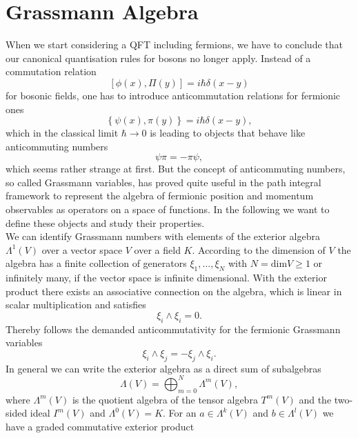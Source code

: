 \section{Grassmann Algebra}
When we start considering a QFT including fermions, we have to conclude that our canonical quantisation rules for bosons no longer apply. Instead of a commutation relation
\begin{equation}
\left[ \phi(x),\Pi(y)\right] = i \hbar \delta(x-y)
\end{equation}
for bosonic fields, one has to introduce anticommutation relations for fermionic ones \cite{Cartier:2002zp}
\begin{equation}
\left\lbrace \psi(x),\pi(y) \right\rbrace = i \hbar \delta(x-y),
\end{equation}
which in the classical limit $\hbar \rightarrow 0$ is leading to objects that behave like anticommuting numbers
\begin{equation}
\psi\pi = -\pi\psi,
\end{equation}
which seems rather strange at first. But the concept of anticommuting numbers, so called Grassmann variables, has proved quite useful in the path integral framework to represent the algebra of fermionic position and momentum observables as operators on a space of functions. In the following we want to define these objects and study their properties.\\[1cm]
%
%
We can identify Grassmann numbers with elements of the exterior algebra $\Lambda^{1}(V)$ over a vector space $V$ over a field $K$. According to the dimension of $V$ the algebra has a finite collection of generators $\xi_{1},\ldots,\xi_{N}$ with $N=\text{dim}V \geq 1$ or infinitely many, if the vector space is infinite dimensional. With the exterior product there exists an associative connection on the algebra, which is linear in scalar multiplication and satisfies
\begin{equation}
\xi_{i}\wedge \xi_{i} =0.
\label{wedge_zero}
\end{equation}
Thereby follows the demanded anticommutativity for the fermionic Grassmann variables
\begin{equation}
\xi_{i}\wedge\xi_{j} = - \xi_{j}\wedge\xi_{i}.
\end{equation}
In general we can write the exterior algebra as a direct sum of subalgebras
\begin{equation}
\Lambda(V)=\bigoplus_{m=0}^{N} \Lambda^{m}(V),
\end{equation}
where $\Lambda^{m}(V)$ is the quotient algebra of the tensor algebra $T^{m}(V)$ and the two-sided ideal $I^{m}(V)$ and $\Lambda^{0}(V)=K$. For an $a \in \Lambda^{k}(V)$ and $b \in \Lambda^{l}(V)$ we have a graded commutative exterior product

